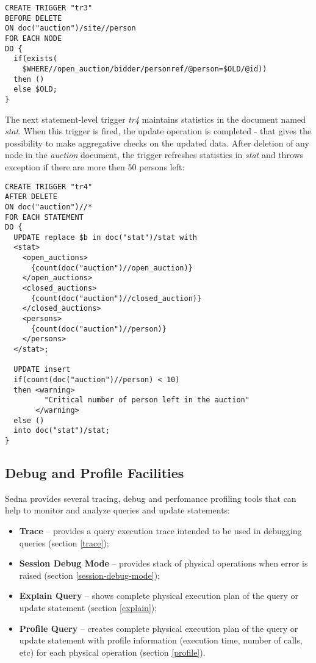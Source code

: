 \documentclass[a4paper,12pt]{article}
\begin{document}
\small{
\begin{verbatim}
CREATE TRIGGER "tr3"
BEFORE DELETE
ON doc("auction")/site//person
FOR EACH NODE
DO {
  if(exists(
    $WHERE//open_auction/bidder/personref/@person=$OLD/@id))
  then ()
  else $OLD;
}
\end{verbatim}}

The next statement-level trigger \emph{tr4} maintains statistics in the document
named \emph{stat}. When this trigger is fired, the update operation is completed
- that gives the possibility to make aggregative checks on the updated data.
After deletion of any node in the \emph{auction} document, the trigger refreshes
statistics in \emph{stat} and throws exception if there are more then 50 persons
left:

\small{
\begin{verbatim}
CREATE TRIGGER "tr4"
AFTER DELETE
ON doc("auction")//*
FOR EACH STATEMENT
DO {
  UPDATE replace $b in doc("stat")/stat with
  <stat>
    <open_auctions>
      {count(doc("auction")//open_auction)}
    </open_auctions>
    <closed_auctions>
      {count(doc("auction")//closed_auction)}
    </closed_auctions>
    <persons>
      {count(doc("auction")//person)}
    </persons>
  </stat>;

  UPDATE insert
  if(count(doc("auction")//person) < 10)
  then <warning>
         "Critical number of person left in the auction"
       </warning>
  else ()
  into doc("stat")/stat;
}
\end{verbatim}}


\subsection{Debug and Profile Facilities}

Sedna provides several tracing, debug and perfomance profiling tools that can
help to monitor and analyze queries and update statements:

\begin{itemize}
\item\textbf{Trace} -- provides a query execution trace intended to be used in
debugging queries (section \ref{trace});
\item\textbf{Session Debug Mode} -- provides stack of physical operations when
error is raised (section \ref{session-debug-mode});
\item\textbf{Explain Query} -- shows complete physical execution plan of the
query or update statement (section \ref{explain});
\item\textbf{Profile Query} -- creates complete physical execution plan of the
query or update statement with profile information (execution time, number of
calls, etc) for each physical operation (section \ref{profile}).
\end{itemize}
\end{document}
